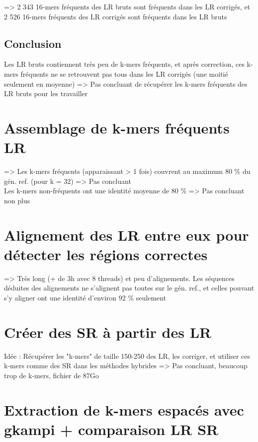 \documentclass[12pt]{article}
\begin{document}
=> 2 343 16-mers fréquents des LR bruts sont fréquents dans les LR corrigés, et 2 526 16-mers fréquents des LR corrigés sont fréquents dans les LR bruts \\

\subsection{Conclusion}

Les LR bruts contiennent très peu de k-mers fréquents, et après correction, ces k-mers fréquents ne se retrouvent pas tous dans les LR corrigés (une moitié seulement en moyenne) => Pas concluant de récupérer les k-mers fréquents des LR bruts pour les travailler

\section{Assemblage de k-mers fréquents LR}

=> Les k-mers fréquents (apparaissant > 1 fois) couvrent au maximum 80 \% du gén. ref. (pour k = 32) => Pas concluant \\

Les k-mers non-fréquents ont une identité moyenne de 80 \% => Pas concluant non plus

\section{Alignement des LR entre eux pour détecter les régions correctes}

=> Très long (+ de 3h avec 8 threads) et peu d'alignements. Les séquences déduites des alignements ne s'alignent pas toutes sur le gén. ref., et celles pouvant s'y aligner ont une identité d'environ 92 \% seulement

\section{Créer des SR à partir des LR}

Idée : Récupérer les "k-mers" de taille 150-250 des LR, les corriger, et utiliser ces k-mers comme des SR dans les méthodes hybrides => Pas concluant,
beaucoup trop de k-mers, fichier de 87Go \\

\section{Extraction de k-mers espacés avec gkampi + comparaison LR SR}
\end{document}
